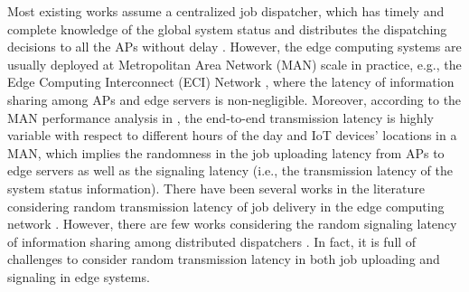 Most existing works assume a centralized job dispatcher, which has timely and complete knowledge of the global system status and distributes the dispatching decisions to all the APs without delay \cite{tan-online,IOTJ18-FanQ,mdp-globecom,mdp-tvt,MASS18-MengZ}.
However, the edge computing systems are usually deployed at Metropolitan Area Network (MAN) scale in practice, e.g., the Edge Computing Interconnect (ECI) Network \cite{MAN-ECI}, where the latency of information sharing among APs and edge servers is non-negligible. Moreover, according to the MAN performance analysis in \cite{MAN-LATENCY}, the end-to-end transmission latency is highly variable with respect to different hours of the day and IoT devices' locations in a MAN, which implies the randomness in the job uploading latency from APs to edge servers as well as the signaling latency (i.e., the transmission latency of the {system status} information).
There have been several works in the literature considering random transmission latency of job delivery in the edge computing network \cite{latency-EDGE19,MOBIHOC19-ZhouZ,IOTJ18-FanQ,TOC19-LiuC,JSAC19-AlameddineHA}.
However, there are few works considering the random signaling latency of information sharing among distributed dispatchers \cite{tan-online,TWC18-LyuX}.
In fact, it is full of {challenges} to consider random transmission latency in both job uploading and signaling in edge systems.

